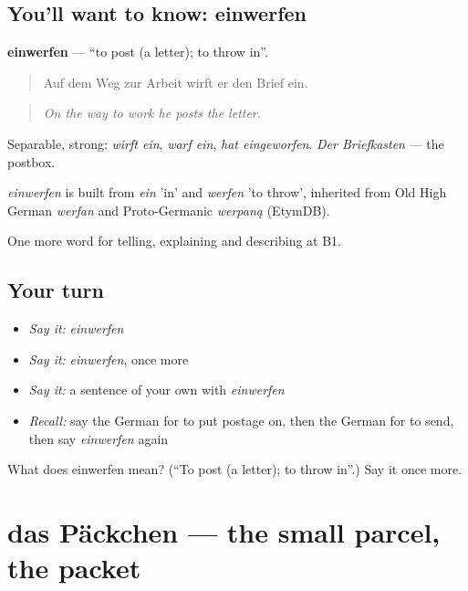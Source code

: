 \subsection*{You'll want to know: einwerfen}
\textbf{einwerfen} — \textquotedblleft{}to post (a letter); to throw in\textquotedblright{}.

\begin{quote}
Auf dem Weg zur Arbeit wirft er den Brief ein.
\end{quote}

\begin{quote}
\emph{On the way to work he posts the letter.}
\end{quote}

Separable, strong: \emph{wirft ein}, \emph{warf ein}, \emph{hat eingeworfen}. \emph{Der Briefkasten} — the postbox.

\begin{cousinweb}
\emph{einwerfen} is built from \emph{ein} 'in' and \emph{werfen} 'to throw', inherited from Old High German \emph{werfan} and Proto-Germanic \emph{werpaną} (EtymDB).
\end{cousinweb}

\begin{grammarlens}[title={What you've built}]
One more word for telling, explaining and describing at B1.
\end{grammarlens}

\subsection*{Your turn}
\begin{itemize}
\raggedright
  \item \emph{Say it:} \emph{einwerfen}
  \item \emph{Say it:} \emph{einwerfen}, once more
  \item \emph{Say it:} a sentence of your own with \emph{einwerfen}
  \item \emph{Recall:} say the German for to put postage on, then the German for to send, then say \emph{einwerfen} again
\end{itemize}

\begin{tcolorbox}[breakable,colback=teal!4,colframe=teal!35!black,title={Before you move on}]
What does einwerfen mean? (\textquotedblleft{}To post (a letter); to throw in\textquotedblright{}.) Say it once more.
\end{tcolorbox}
\section[das Päckchen]{das Päckchen — the small parcel, the packet}

